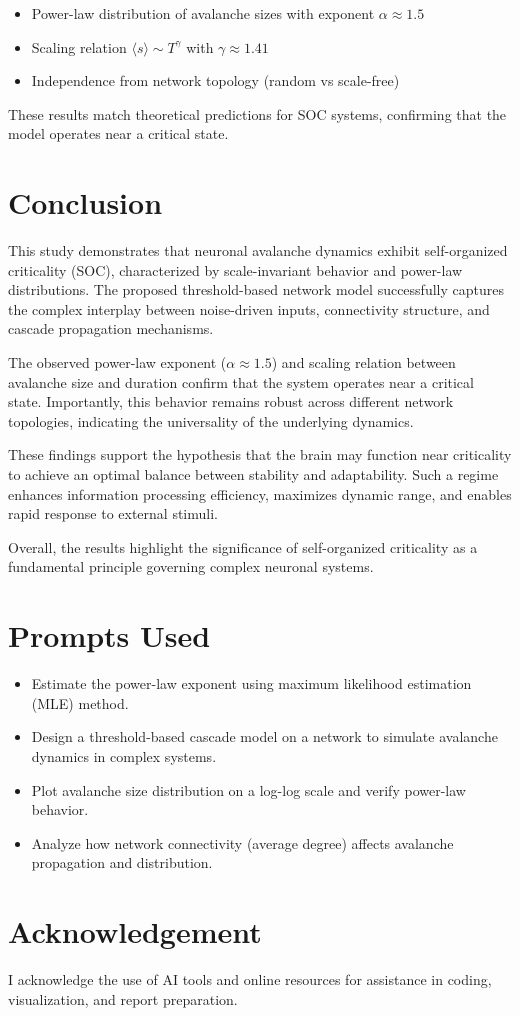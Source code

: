 \documentclass[12pt]{article}
\begin{document}
\begin{itemize}
\item Power-law distribution of avalanche sizes with exponent $\alpha \approx 1.5$
\item Scaling relation $\langle s \rangle \sim T^\gamma$ with $\gamma \approx 1.41$
\item Independence from network topology (random vs scale-free)
\end{itemize}

These results match theoretical predictions for SOC systems, confirming that the model operates near a critical state.

\section{Conclusion}

This study demonstrates that neuronal avalanche dynamics exhibit self-organized criticality (SOC), characterized by scale-invariant behavior and power-law distributions. The proposed threshold-based network model successfully captures the complex interplay between noise-driven inputs, connectivity structure, and cascade propagation mechanisms.

The observed power-law exponent ($\alpha \approx 1.5$) and scaling relation between avalanche size and duration confirm that the system operates near a critical state. Importantly, this behavior remains robust across different network topologies, indicating the universality of the underlying dynamics.

These findings support the hypothesis that the brain may function near criticality to achieve an optimal balance between stability and adaptability. Such a regime enhances information processing efficiency, maximizes dynamic range, and enables rapid response to external stimuli.

Overall, the results highlight the significance of self-organized criticality as a fundamental principle governing complex neuronal systems.

\section{Prompts Used}

\begin{itemize}
\item Estimate the power-law exponent using maximum likelihood estimation (MLE) method.
\item Design a threshold-based cascade model on a network to simulate avalanche dynamics in complex systems.
\item Plot avalanche size distribution on a log-log scale and verify power-law behavior.
\item Analyze how network connectivity (average degree) affects avalanche propagation and distribution.
\end{itemize}

\section{Acknowledgement}

I acknowledge the use of AI tools and online resources for assistance in coding, visualization, and report preparation.
\end{document}
